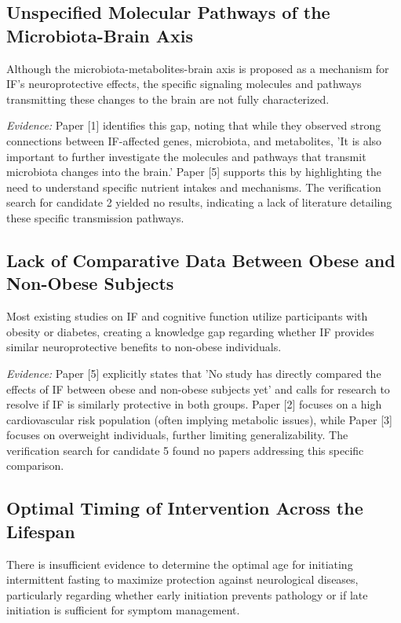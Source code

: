 \documentclass[11pt]{article}
\begin{document}
\subsection{Unspecified Molecular Pathways of the Microbiota-Brain Axis}
Although the microbiota-metabolites-brain axis is proposed as a mechanism for IF's neuroprotective effects, the specific signaling molecules and pathways transmitting these changes to the brain are not fully characterized.

\textit{Evidence:} Paper [1] identifies this gap, noting that while they observed strong connections between IF-affected genes, microbiota, and metabolites, 'It is also important to further investigate the molecules and pathways that transmit microbiota changes into the brain.' Paper [5] supports this by highlighting the need to understand specific nutrient intakes and mechanisms. The verification search for candidate 2 yielded no results, indicating a lack of literature detailing these specific transmission pathways.

\subsection{Lack of Comparative Data Between Obese and Non-Obese Subjects}
Most existing studies on IF and cognitive function utilize participants with obesity or diabetes, creating a knowledge gap regarding whether IF provides similar neuroprotective benefits to non-obese individuals.

\textit{Evidence:} Paper [5] explicitly states that 'No study has directly compared the effects of IF between obese and non-obese subjects yet' and calls for research to resolve if IF is similarly protective in both groups. Paper [2] focuses on a high cardiovascular risk population (often implying metabolic issues), while Paper [3] focuses on overweight individuals, further limiting generalizability. The verification search for candidate 5 found no papers addressing this specific comparison.

\subsection{Optimal Timing of Intervention Across the Lifespan}
There is insufficient evidence to determine the optimal age for initiating intermittent fasting to maximize protection against neurological diseases, particularly regarding whether early initiation prevents pathology or if late initiation is sufficient for symptom management.
\end{document}
